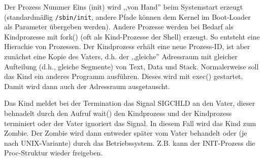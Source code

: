 \begin{answer}
  Der Prozess Nummer Eins (init) wird ,,von Hand'' beim Systemstart erzeugt (standardmäßig \texttt{/sbin/init}, andere Pfade können dem Kernel im Boot-Loader als Parameter übergeben werden).
  Andere Prozesse werden bei Bedarf als Kindprozesse mit fork() (oft als Kind-Prozesse
  der Shell) erzeugt. So entsteht eine Hierachie von Prozessen. Der Kindprozess erhält eine
  neue Prozess-ID, ist aber zunächst eine Kopie des Vaters, d.h. der ,,gleiche'' Adressraum
  mit gleicher Aufteilung (d.h., gleiche Segmente) von Text, Data und Stack. Normalerweise soll das Kind ein anderes
  Programm ausführen. Dieses wird mit exec() gestartet. Damit wird dann auch der
  Adressraum ausgetauscht.
\end{answer}

\begin{answer}
  Das Kind meldet bei der Termination das Signal SIGCHLD an den Vater, dieser behnadelt
  durch den Aufruf wait() den Kindprozess und der Kindprozess terminiert
  oder der Vater ignoriert das Signal. In diesem Fall wird das Kind zum Zombie. Der Zombie
  wird dann entweder später vom Vater behandelt oder (je nach UNIX-Variante) durch das
  Betriebssystem. Z.B. kann der INIT-Prozess die Proc-Struktur wieder freigeben.
\end{answer}

